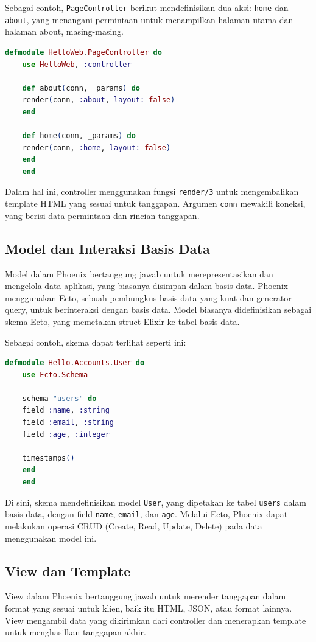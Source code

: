 Sebagai contoh, \texttt{PageController} berikut mendefinisikan dua aksi: \texttt{home} dan \texttt{about}, yang menangani permintaan untuk menampilkan halaman utama dan halaman about, masing-masing.

\begin{lstlisting}[language=Elixir]
	defmodule HelloWeb.PageController do
	use HelloWeb, :controller
	
	def about(conn, _params) do
	render(conn, :about, layout: false)
	end
	
	def home(conn, _params) do
	render(conn, :home, layout: false)
	end
	end
\end{lstlisting}

Dalam hal ini, controller menggunakan fungsi \texttt{render/3} untuk mengembalikan template HTML yang sesuai untuk tanggapan. Argumen \texttt{conn} mewakili koneksi, yang berisi data permintaan dan rincian tanggapan.

\subsection{Model dan Interaksi Basis Data}
Model dalam Phoenix bertanggung jawab untuk merepresentasikan dan mengelola data aplikasi, yang biasanya disimpan dalam basis data. Phoenix menggunakan Ecto, sebuah pembungkus basis data yang kuat dan generator query, untuk berinteraksi dengan basis data. Model biasanya didefinisikan sebagai skema Ecto, yang memetakan struct Elixir ke tabel basis data.

Sebagai contoh, skema dapat terlihat seperti ini:
\begin{lstlisting}[language=Elixir]
	defmodule Hello.Accounts.User do
	use Ecto.Schema
	
	schema "users" do
	field :name, :string
	field :email, :string
	field :age, :integer
	
	timestamps()
	end
	end
\end{lstlisting}

Di sini, skema mendefinisikan model \texttt{User}, yang dipetakan ke tabel \texttt{users} dalam basis data, dengan field \texttt{name}, \texttt{email}, dan \texttt{age}. Melalui Ecto, Phoenix dapat melakukan operasi CRUD (Create, Read, Update, Delete) pada data menggunakan model ini.

\subsection{View dan Template}
View dalam Phoenix bertanggung jawab untuk merender tanggapan dalam format yang sesuai untuk klien, baik itu HTML, JSON, atau format lainnya. View mengambil data yang dikirimkan dari controller dan menerapkan template untuk menghasilkan tanggapan akhir.

